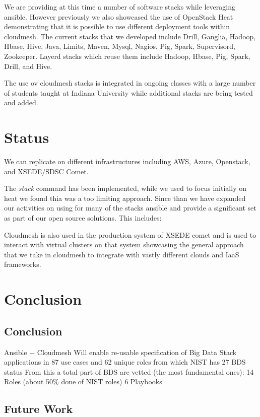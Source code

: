 We are providing at this time a number of software stacks while
leveraging ansible. However previously we also showcased the use of
OpenStack Heat demonstrating that it is possible to use different
deployment tools within cloudmesh.  The current stacks that we
developed include Drill, Ganglia, Hadoop, Hbase, Hive, Java, Limits,
Maven, Mysql, Nagios, Pig, Spark, Supervisord, Zookeeper. Layerd
stacks which reuse them include Hadoop, Hbase, Pig, Spark, Drill, and
Hive.

The use ov cloudmesh stacks is integrated in ongoing classes with a
large number of students taught at Indiana University while additional
stacks are being tested and added.




\section{Status}


We can replicate on different infrastructures including AWS, Azure,
Openstack, and XSEDE/SDSC Comet.

The {\it stack} command has been implemented, while we used to focus initially
on heat we found thia was a too limiting approach. Since than we have
expanded our activities on using for many of the stacks ansible and
provide a significant set as part of our open source solutions. This
includes:


Cloudmesh is also used in the production system of XSEDE comet and is
used to interact with virtual clusters on that system showcasing the
general approach that we take in cloudmesh to integrate with vastly
different clouds and IaaS frameworks.

\section{Conclusion}\label{S:conclusion}


\subsection{Conclusion}
Ansible + Cloudmesh
Will enable re-usable specification of Big Data Stack applications in 87 use cases and 62 unique roles from which NIST has 27
BDS status
From this a total part of BDS are vetted (the most fundamental ones): 
14 Roles  (about 50\% done of NIST roles)
6   Playbooks



\subsection{Future Work}



